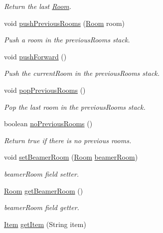 \begin{DoxyCompactItemize}
\begin{DoxyCompactList}\small\item\em Return the last \hyperlink{classRoom}{Room}. \end{DoxyCompactList}\item 
void \hyperlink{classPlayer_a9876b243ed81c12d529efb966c7493bd}{push\-Previous\-Rooms} (\hyperlink{classRoom}{Room} room)
\begin{DoxyCompactList}\small\item\em Push a room in the previous\-Rooms stack. \end{DoxyCompactList}\item 
void \hyperlink{classPlayer_aa48b1a95af18f177f07791a4bbc79c11}{push\-Forward} ()
\begin{DoxyCompactList}\small\item\em Push the current\-Room in the previous\-Rooms stack. \end{DoxyCompactList}\item 
void \hyperlink{classPlayer_a41ac808d0a06379c58c8f543f0c723a8}{pop\-Previous\-Rooms} ()
\begin{DoxyCompactList}\small\item\em Pop the last room in the previous\-Rooms stack. \end{DoxyCompactList}\item 
boolean \hyperlink{classPlayer_a145212a16497c374921567ea9a88f546}{no\-Previous\-Rooms} ()
\begin{DoxyCompactList}\small\item\em Return true if there is no previous rooms. \end{DoxyCompactList}\item 
void \hyperlink{classPlayer_a0a7c3edcdd438c8f6fb628b9926da207}{set\-Beamer\-Room} (\hyperlink{classRoom}{Room} \hyperlink{classPlayer_a0d4ea9ed469b7daae679913aea85ea4b}{beamer\-Room})
\begin{DoxyCompactList}\small\item\em beamer\-Room field setter. \end{DoxyCompactList}\item 
\hyperlink{classRoom}{Room} \hyperlink{classPlayer_a9114998742351bf793e093cb198993ca}{get\-Beamer\-Room} ()
\begin{DoxyCompactList}\small\item\em beamer\-Room field getter. \end{DoxyCompactList}\item 
\hyperlink{classItem}{Item} \hyperlink{classPlayer_a8c183303976b4ea5d0c10fdbff14e4a1}{get\-Item} (String item)

\end{DoxyCompactItemize}
